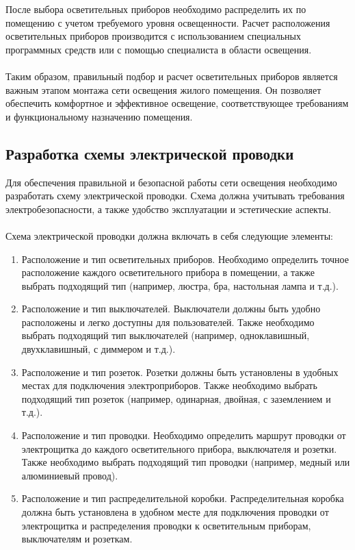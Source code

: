 \documentclass{article}
\begin{document}
После выбора осветительных приборов необходимо распределить их по помещению с учетом требуемого уровня освещенности. Расчет расположения осветительных приборов производится с использованием специальных программных средств или с помощью специалиста в области освещения.\\
~\\
Таким образом, правильный подбор и расчет осветительных приборов является важным этапом монтажа сети освещения жилого помещения. Он позволяет обеспечить комфортное и эффективное освещение, соответствующее требованиям и функциональному назначению помещения.
\subsection{Разработка схемы электрической проводки}
Для обеспечения правильной и безопасной работы сети освещения необходимо разработать схему электрической проводки. Схема должна учитывать требования электробезопасности, а также удобство эксплуатации и эстетические аспекты.\\
~\\
Схема электрической проводки должна включать в себя следующие элементы:
\begin{enumerate}
\item Расположение и тип осветительных приборов. Необходимо определить точное расположение каждого осветительного прибора в помещении, а также выбрать подходящий тип (например, люстра, бра, настольная лампа и т.д.).
\item Расположение и тип выключателей. Выключатели должны быть удобно расположены и легко доступны для пользователей. Также необходимо выбрать подходящий тип выключателей (например, одноклавишный, двухклавишный, с диммером и т.д.).
\item Расположение и тип розеток. Розетки должны быть установлены в удобных местах для подключения электроприборов. Также необходимо выбрать подходящий тип розеток (например, одинарная, двойная, с заземлением и т.д.).
\item Расположение и тип проводки. Необходимо определить маршрут проводки от электрощитка до каждого осветительного прибора, выключателя и розетки. Также необходимо выбрать подходящий тип проводки (например, медный или алюминиевый провод).
\item Расположение и тип распределительной коробки. Распределительная коробка должна быть установлена в удобном месте для подключения проводки от электрощитка и распределения проводки к осветительным приборам, выключателям и розеткам.
\end{enumerate}
\end{document}
